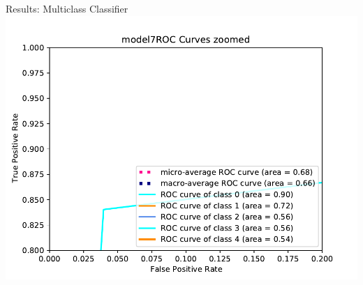 \documentclass[10pt,handout]{beamer}
\begin{document}
\begin{frame}{Results: Multiclass Classifier}
\centering
\includegraphics[scale=0.6]{model7_ROCcurveszoom.pdf}
\end{frame}
\end{document}
